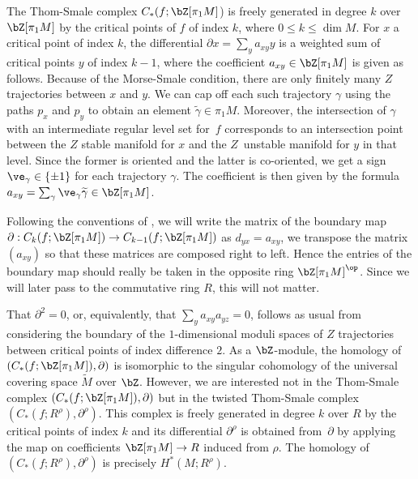 The Thom-Smale complex $C_*(f ; \bZ[\pi_1M]$) is freely generated in degree $k$ over $\bZ[\pi_1M]$ by the critical points of $f$ of index $k$, where $0 \leq k \leq \dim M$. For $x$ a critical point of index $k$, the differential $\partial x = \sum_y a_{xy} y$ is a weighted sum of critical points $y$ of index $k-1$, where the coefficient $a_{xy} \in \bZ[\pi_1M]$ is given as follows. Because of the Morse-Smale condition, there are only finitely many $Z$ trajectories between $x$ and $y$. We can cap off each such trajectory $\gamma$ using the paths $p_x$ and $p_y$ to obtain an element $\widetilde \gamma \in \pi_1M$. Moreover, the intersection of $\gamma$ with an intermediate regular level set for~$f$ corresponds to an intersection point between the $Z$ stable manifold for $x$ and the $Z$~unstable manifold for $y$ in that level. Since the former is oriented and the latter is co-oriented, we get a sign $\ve_\gamma \in \{\pm 1\}$ for each trajectory $\gamma$. The coefficient is then given by the formula $a_{xy} = \sum_\gamma \ve_\gamma \widetilde \gamma \in \bZ[\pi_1M]$.

\begin{remark}\label{second remark about IK conventions}
Following the conventions of \cite{IK93}, we will write the matrix of the boundary map $\partial :C_k(f ; \bZ[\pi_1M]) \to C_{k-1}(f ; \bZ[\pi_1 M])$ as $d_{yx}=a_{xy}$, \ie we transpose the matrix $(a_{xy})$ so that these matrices are composed right to left. Hence the entries of the boundary map should really be taken in the opposite ring $\bZ[\pi_1M]^{\op}$. Since we will later pass to the commutative ring $R$, this will not matter.
\end{remark}

That $\partial^2=0$, or, equivalently, that $\sum_y a_{xy} a_{yz}=0$, follows as usual from considering the boundary of the $1$-dimensional moduli spaces of $Z$ trajectories between critical points of index difference $2$. As a $\bZ$-module, the homology of $(C_*(f ; \bZ[\pi_1M]), \partial)$ is isomorphic to the singular cohomology of the universal covering space $\widetilde M$ over $\bZ$. However, we are interested not in the Thom-Smale complex $(C_*(f ; \bZ[\pi_1M]), \partial)$ but in the twisted Thom-Smale complex $(C_*(f ; R^\rho), \partial^\rho)$. This complex is freely generated in degree $k$ over $R$ by the critical points of index $k$ and its differential $\partial^\rho$ is obtained from~$\partial$ by applying the map on coefficients $\bZ[\pi_1M] \to R$ induced from $\rho$. The homology of $(C_*(f; R^\rho),\partial^\rho)$ is precisely $H^*(M;R^\rho)$.

